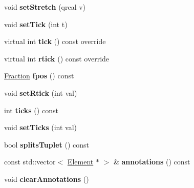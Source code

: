 \begin{DoxyCompactItemize}
\mbox{\label{class_ms_1_1_segment_a3cc5cb6dbcd884168c976ec987051222}} 
void {\bfseries set\+Stretch} (qreal v)
\item 
\mbox{\label{class_ms_1_1_segment_af1ce0f62b818f102f2a4fa8a28b49072}} 
void {\bfseries set\+Tick} (int t)
\item 
\mbox{\label{class_ms_1_1_segment_af93a955ec062b398ee1d9b7306c9af13}} 
virtual int {\bfseries tick} () const override
\item 
\mbox{\label{class_ms_1_1_segment_a44badcb0a9b677e9c28666775c9ffd5e}} 
virtual int {\bfseries rtick} () const override
\item 
\mbox{\label{class_ms_1_1_segment_a7490fad70b1be0ca3ad3c4e3dd2ed9e0}} 
\hyperlink{class_ms_1_1_fraction}{Fraction} {\bfseries fpos} () const
\item 
\mbox{\label{class_ms_1_1_segment_a83a8c953a9e8d729eb89fb2a68c1127e}} 
void {\bfseries set\+Rtick} (int val)
\item 
\mbox{\label{class_ms_1_1_segment_aea801c78c2f6c83f322ac477814eb8e5}} 
int {\bfseries ticks} () const
\item 
\mbox{\label{class_ms_1_1_segment_a8b34e6feffe3a7d87a8ba7209a53cbf0}} 
void {\bfseries set\+Ticks} (int val)
\item 
\mbox{\label{class_ms_1_1_segment_a7e392d82964e59dd59bef7c1ae6ffd65}} 
bool {\bfseries splits\+Tuplet} () const
\item 
\mbox{\label{class_ms_1_1_segment_ac30bce62d008049b47f408497d32dccc}} 
const std\+::vector$<$ \hyperlink{class_ms_1_1_element}{Element} $\ast$ $>$ \& {\bfseries annotations} () const
\item 
\mbox{\label{class_ms_1_1_segment_a323a02bed284456b6ed6efeb4cc1e191}} 
void {\bfseries clear\+Annotations} ()
\item 
\mbox{\label{class_ms_1_1_segment_a6cc607fbbb0bbd2fbaf44977a8654617}} 

\end{DoxyCompactItemize}
